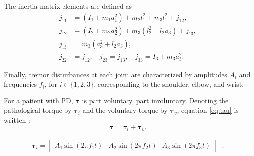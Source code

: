     The inertia matrix elements are defined as
    \begin{align}
        j_{11} &= (I_1 + m_1 a_1^2) + m_2 l_1^2 + m_3 l_1^2 + j_{12}, \\
        j_{12} &= (I_2 + m_2 a_2^2) + m_3 (l_2^2 + l_2 a_3) + j_{13}, \\
        j_{13} &= m_3 (a_3^2 + l_2 a_3), \\
        j_{22} &= j_{12}, \quad
        j_{23} = j_{13}, \quad 
        j_{33} = I_3 + m_3 a_3^2.
    \end{align}
    
    Finally, tremor disturbances at each joint are characterized by amplitudes $A_i$ and frequencies $f_i$, for $i \in \{1, 2, 3\}$, corresponding to the shoulder, elbow, and wrist.

    For a patient with PD, $\bm{\tau}$ is part voluntary, part involuntary.
    Denoting the pathological torque by $\bm{\tau}_i$ and the voluntary torque by $\bm{\tau}_v$,
    equation \eqref{eq:tau} is written \citep{Qi:2024}:
    \begin{equation}
        \bm{\tau} = \bm{\tau}_i + \bm{\tau}_v.
    \label{eq:tau}
    \end{equation}

    \begin{equation}
        \bm{\tau}_i = 
        \begin{bmatrix} 
            A_1\sin(2\pi f_1 t) &
            A_2\sin(2\pi f_2 t) &
            A_3\sin(2\pi f_3 t) 
        \end{bmatrix}^\top.
    \label{eq:tau_PD}
    \end{equation}

